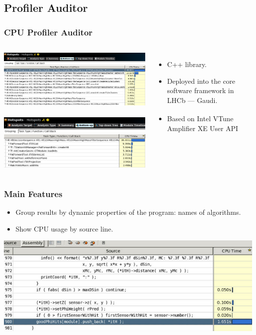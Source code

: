 \documentclass{beamer}
\begin{document}
\subsection{Profiler Auditor}
\begin{frame}
\frametitle{CPU Profiler Auditor}
\begin{columns}[c]
\includegraphics[width=\textwidth]{images/cpu01.png}\\~\\
\includegraphics[width=\textwidth]{images/cpu02.png}
\begin{itemize}
    \item C++ library.
    \item Deployed into the core software framework in LHCb --- Gaudi.
    \item Based on Intel\textsuperscript{\textregistered} VTune\texttrademark
    Amplifier XE User API
\end{itemize}
\end{columns}
\end{frame}

\begin{frame}
\frametitle{Main Features}
\begin{itemize}
    \item Group results by dynamic properties of the program: names of algorithms.
    \item Show CPU usage by source line.
\end{itemize}
\includegraphics[width=\textwidth]{images/cpu03.png}
\end{frame}
\end{document}
